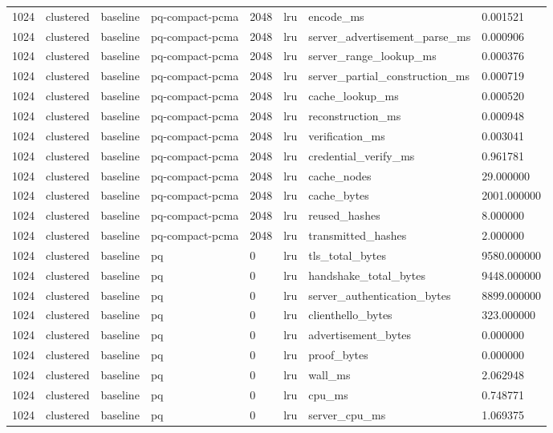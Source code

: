 \begin{tabular}{llllllll}
1024 & clustered & baseline & pq-compact-pcma & 2048 & lru & encode\_ms & 0.001521 \\
1024 & clustered & baseline & pq-compact-pcma & 2048 & lru & server\_advertisement\_parse\_ms & 0.000906 \\
1024 & clustered & baseline & pq-compact-pcma & 2048 & lru & server\_range\_lookup\_ms & 0.000376 \\
1024 & clustered & baseline & pq-compact-pcma & 2048 & lru & server\_partial\_construction\_ms & 0.000719 \\
1024 & clustered & baseline & pq-compact-pcma & 2048 & lru & cache\_lookup\_ms & 0.000520 \\
1024 & clustered & baseline & pq-compact-pcma & 2048 & lru & reconstruction\_ms & 0.000948 \\
1024 & clustered & baseline & pq-compact-pcma & 2048 & lru & verification\_ms & 0.003041 \\
1024 & clustered & baseline & pq-compact-pcma & 2048 & lru & credential\_verify\_ms & 0.961781 \\
1024 & clustered & baseline & pq-compact-pcma & 2048 & lru & cache\_nodes & 29.000000 \\
1024 & clustered & baseline & pq-compact-pcma & 2048 & lru & cache\_bytes & 2001.000000 \\
1024 & clustered & baseline & pq-compact-pcma & 2048 & lru & reused\_hashes & 8.000000 \\
1024 & clustered & baseline & pq-compact-pcma & 2048 & lru & transmitted\_hashes & 2.000000 \\
1024 & clustered & baseline & pq & 0 & lru & tls\_total\_bytes & 9580.000000 \\
1024 & clustered & baseline & pq & 0 & lru & handshake\_total\_bytes & 9448.000000 \\
1024 & clustered & baseline & pq & 0 & lru & server\_authentication\_bytes & 8899.000000 \\
1024 & clustered & baseline & pq & 0 & lru & clienthello\_bytes & 323.000000 \\
1024 & clustered & baseline & pq & 0 & lru & advertisement\_bytes & 0.000000 \\
1024 & clustered & baseline & pq & 0 & lru & proof\_bytes & 0.000000 \\
1024 & clustered & baseline & pq & 0 & lru & wall\_ms & 2.062948 \\
1024 & clustered & baseline & pq & 0 & lru & cpu\_ms & 0.748771 \\
1024 & clustered & baseline & pq & 0 & lru & server\_cpu\_ms & 1.069375 \\

\end{tabular}
